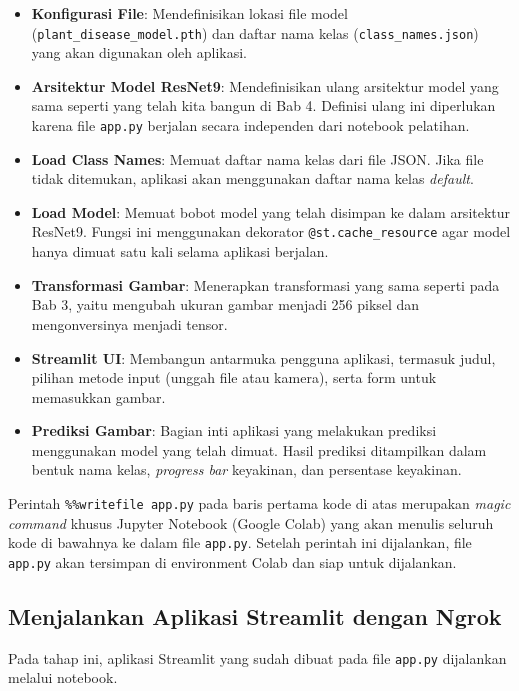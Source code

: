 \begin{itemize}
    \item \textbf{Konfigurasi File}: Mendefinisikan lokasi file model (\texttt{plant\_disease\_model.pth}) dan daftar nama kelas (\texttt{class\_names.json}) yang akan digunakan oleh aplikasi.
    \item \textbf{Arsitektur Model ResNet9}: Mendefinisikan ulang arsitektur model yang sama seperti yang telah kita bangun di Bab 4. Definisi ulang ini diperlukan karena file \texttt{app.py} berjalan secara independen dari notebook pelatihan.
    \item \textbf{Load Class Names}: Memuat daftar nama kelas dari file JSON. Jika file tidak ditemukan, aplikasi akan menggunakan daftar nama kelas \textit{default}.
    \item \textbf{Load Model}: Memuat bobot model yang telah disimpan ke dalam arsitektur ResNet9. Fungsi ini menggunakan dekorator \texttt{@st.cache\_resource} agar model hanya dimuat satu kali selama aplikasi berjalan.
    \item \textbf{Transformasi Gambar}: Menerapkan transformasi yang sama seperti pada Bab 3, yaitu mengubah ukuran gambar menjadi 256 piksel dan mengonversinya menjadi tensor.
    \item \textbf{Streamlit UI}: Membangun antarmuka pengguna aplikasi, termasuk judul, pilihan metode input (unggah file atau kamera), serta form untuk memasukkan gambar.
    \item \textbf{Prediksi Gambar}: Bagian inti aplikasi yang melakukan prediksi menggunakan model yang telah dimuat. Hasil prediksi ditampilkan dalam bentuk nama kelas, \textit{progress bar} keyakinan, dan persentase keyakinan.
\end{itemize}

Perintah \texttt{\%\%writefile app.py} pada baris pertama kode di atas merupakan \textit{magic command} khusus Jupyter Notebook (Google Colab) yang akan menulis seluruh kode di bawahnya ke dalam file \texttt{app.py}. Setelah perintah ini dijalankan, file \texttt{app.py} akan tersimpan di environment Colab dan siap untuk dijalankan.

\subsection{Menjalankan Aplikasi Streamlit dengan Ngrok}

Pada tahap ini, aplikasi Streamlit yang sudah dibuat pada file \texttt{app.py} dijalankan melalui notebook.

